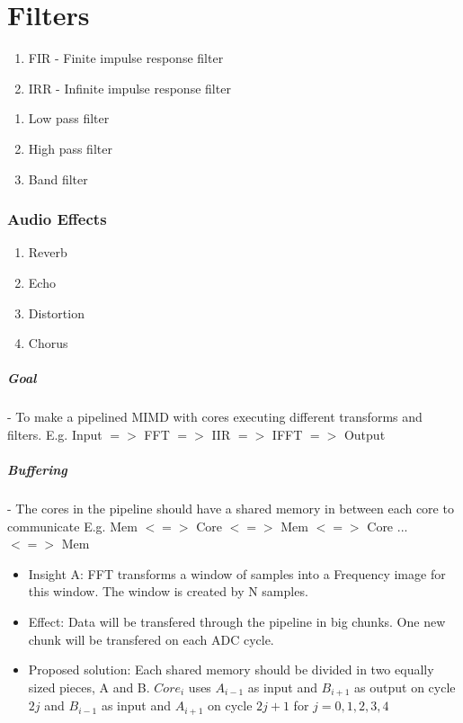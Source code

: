 \chapter{Filters}

\begin{enumerate}
	\item FIR - Finite impulse response filter
	\item IRR - Infinite impulse response filter
\end{enumerate}

\begin{enumerate}
	\item Low pass filter
	\item High pass filter
	\item Band filter
\end{enumerate}

\subsection{Audio Effects}

\begin{enumerate}
	\item Reverb
	\item Echo
	\item Distortion
	\item Chorus
\end{enumerate}

\paragraph{Goal}
- To make a pipelined MIMD with cores executing different transforms and
filters.
	E.g. Input $=>$ FFT $=>$ IIR $=>$ IFFT $=>$ Output

\paragraph{Buffering}
- The cores in the pipeline should have a shared memory in between each core to
communicate
	E.g. Mem $<=>$ Core $<=>$ Mem $<=>$ Core ... $<=>$ Mem

\begin{itemize}
	\item Insight A: FFT transforms a window of samples into a Frequency image
for this window. The window is created by N samples.
	\item Effect: Data will be transfered through the pipeline in big chunks. One
new chunk will be transfered on each ADC cycle.
	\item Proposed solution: Each shared memory should be divided in two equally
sized pieces, A and B. $Core_i$ uses $A_{i-1}$ as input and $B_{i+1}$ as
output on cycle $2j$ and $B_{i-1}$ as input and $A_{i+1}$ on cycle $2j+1$ for
$j = 0,1,2,3,4$
\end{itemize}

